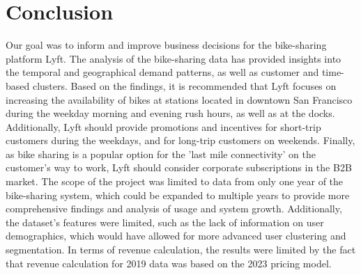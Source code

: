 \section{Conclusion}

Our goal was to inform and improve business decisions for the bike-sharing platform Lyft. The analysis of the bike-sharing data has provided insights into the temporal and geographical demand patterns, as well as customer and time-based clusters. Based on the findings, it is recommended that Lyft focuses on increasing the availability of bikes at stations located in downtown San Francisco during the weekday morning and evening rush hours, as well as at the docks. Additionally, Lyft should provide promotions and incentives for short-trip customers during the weekdays, and for long-trip customers on weekends. Finally, as bike sharing is a popular option for the 'last mile connectivity' on the customer's way to work, Lyft should consider corporate subscriptions in the B2B market.
The scope of the project was limited to data from only one year of the bike-sharing system, which could be expanded to multiple years to provide more comprehensive findings and analysis of usage and system growth. Additionally, the dataset's features were limited, such as the lack of information on user demographics, which would have allowed for more advanced user clustering and segmentation. In terms of revenue calculation, the results were limited by the fact that revenue calculation for 2019 data was based on the 2023 pricing model. 
